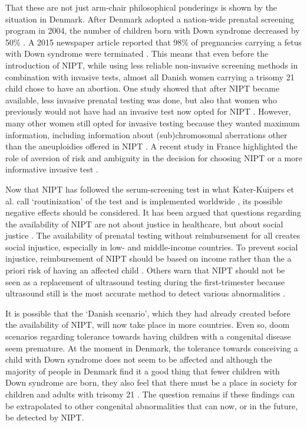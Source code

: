 That these are not just arm-chair philosophical ponderings is shown by the situation in Denmark. 
After Denmark adopted a nation-wide prenatal screening program in 2004, the number of children born with Down syndrome decreased by 50\% \cite{Ekelund_2008,Lou_2018}. 
A 2015 newspaper article reported that 98\% of pregnancies carrying a fetus with Down syndrome were terminated \cite{Kastberg_2015}. 
This means that even before the introduction of NIPT, while using less reliable non-invasive screening methods in combination with invasive tests, almost all Danish women carrying a trisomy 21 child chose to have an abortion. 
One study showed that after NIPT became available, less invasive prenatal testing was done, but also that women who previously would not have had an invasive test now opted for NIPT \cite{Bjerregaard_2017}. 
However, many other women still opted for invasive testing because they wanted maximum information, including information about (sub)chromosomal aberrations other than the aneuploidies offered in NIPT \cite{Lou_2018}. 
A recent study in France highlighted the role of aversion of risk and ambiguity in the decision for choosing NIPT or a more informative invasive test \cite{Seror_2019}.

Now that NIPT has followed the serum-screening test in what Kater-Kuipers et al. call ‘routinization’ of the test \cite{Kater_Kuipers_2018} and is implemented worldwide \cite{Allyse_2015}, its possible negative effects should be considered. 
It has been argued that questions regarding the availability of NIPT are not about justice in healthcare, but about social justice \cite{Rolfes_2016}. 
The availability of prenatal testing without reimbursement for all creates social injustice, especially in low- and middle-income countries. 
To prevent social injustice, reimbursement of NIPT should be based on income rather than the a priori risk of having an affected child \cite{Rolfes_2016}. 
Others warn that NIPT should not be seen as a replacement of ultrasound testing during the first-trimester because ultrasound still is the most accurate method to detect various abnormalities \cite{Amorim_Costa_2017}.

It is possible that the ‘Danish scenario’, which they had already created before the availability of NIPT, will now take place in more countries. 
Even so, doom scenarios regarding tolerance towards having children with a congenital disease seem premature. 
At the moment in Denmark, the tolerance towards conceiving a child with Down syndrome does not seem to be affected and although the majority of people in Denmark find it a good thing that fewer children with Down syndrome are born, they also feel that there must be a place in society for children and adults with trisomy 21 \cite{Joachim_2017}. 
The question remains if these findings can be extrapolated to other congenital abnormalities that can now, or in the future, be detected by NIPT.

